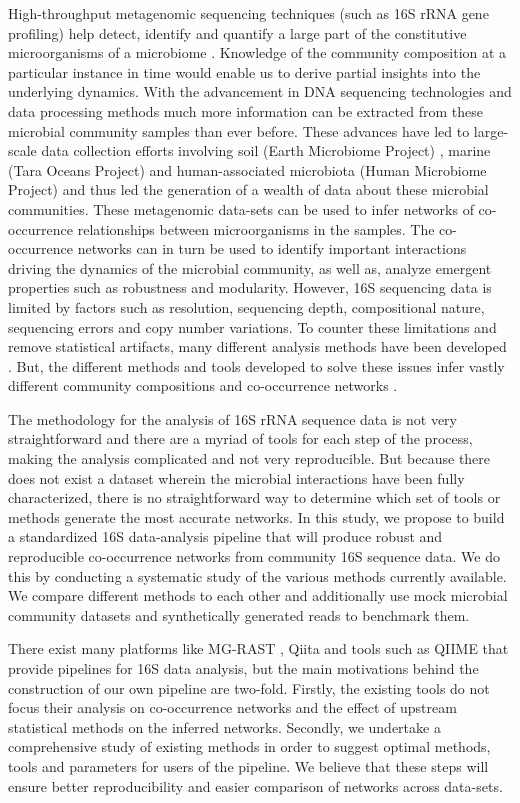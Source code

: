   High-throughput metagenomic sequencing techniques (such as 16S rRNA gene profiling) help detect, identify and quantify a large part of the constitutive microorganisms of a microbiome \cite{Jovel2016}.
  Knowledge of the community composition at a particular instance in time would enable us to derive partial insights into the underlying dynamics.
  With the advancement in DNA sequencing technologies \cite{Narihiro2017} and data processing methods much more information can be extracted from these microbial community samples than ever before.
  These advances have led to large-scale data collection efforts involving soil (Earth Microbiome Project) \cite{Thompson2017}, marine (Tara Oceans Project) \cite{Zhang2015} and human-associated microbiota (Human Microbiome Project) \cite{HumanMicrobiomeProjectConsortium2012} and thus led the generation of a wealth of data about these microbial communities.
  These metagenomic data-sets can be used to infer networks of co-occurrence relationships between microorganisms in the samples.
  The co-occurrence networks can in turn be used to identify important interactions driving the dynamics of the microbial community, as well as, analyze emergent properties such as robustness and modularity.
  However, 16S sequencing data is limited by factors such as resolution, sequencing depth, compositional nature, sequencing errors and copy number variations.
  To counter these limitations and remove statistical artifacts, many different analysis methods have been developed \cite{Callahan2016,Amir2017,Friedman2012,Kurtz2015}.
  But, the different methods and tools developed to solve these issues infer vastly different community compositions and co-occurrence networks \cite{Golob2017,Weiss2016}.

  The methodology for the analysis of 16S rRNA sequence data is not very straightforward and there are a myriad of tools for each step of the process, making the analysis complicated and not very reproducible.
  But because there does not exist a dataset wherein the microbial interactions have been fully characterized, there is no straightforward way to determine which set of tools or methods generate the most accurate networks.
  In this study, we propose to build a standardized 16S data-analysis pipeline that will produce robust and reproducible co-occurrence networks from community 16S sequence data.
  We do this by conducting a systematic study of the various methods currently available.
  We compare different methods to each other and additionally use mock microbial community datasets and synthetically generated reads to benchmark them.

  There exist many platforms like MG-RAST \cite{Keegan2016}, Qiita \cite{qiita} and tools such as QIIME \cite{Caporaso2010} that provide pipelines for 16S data analysis, but the main motivations behind the construction of our own pipeline are two-fold.
  Firstly, the existing tools do not focus their analysis on co-occurrence networks and the effect of upstream statistical methods on the inferred networks.
  Secondly, we undertake a comprehensive study of existing methods in order to suggest optimal methods, tools and parameters for users of the pipeline.
  We believe that these steps will ensure better reproducibility and easier comparison of networks across data-sets.
